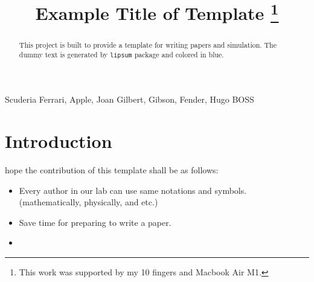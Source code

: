 \documentclass[conference]{IEEEtran}
\begin{document}
\title{
    Example Title of Template
    \thanks{
        This work was supported by my 10 fingers and Macbook Air M1.
    }
}

\author{
\and
}

\maketitle 
\thispagestyle{empty}

\begin{abstract}
	This project is built to provide a template for writing papers and simulation.
	The dummy text is generated by \texttt{lipsum} package and colored in blue.
	\color{blue}\lipsum[1]\color{black}
\end{abstract}

\begin{IEEEkeywords}
	Scuderia Ferrari, Apple, Joan Gilbert, Gibson, Fender, Hugo BOSS
\end{IEEEkeywords}

\section{Introduction}

 hope the contribution of this template shall be as follows:
\begin{itemize}
    \item Every author in our lab can use same notations and symbols. (\eg mathematically, physically, and etc.)
    \item Save time for preparing to write a paper.
    \item \cite{Arefinia:2017aa}    
\end{itemize}
\end{document}
